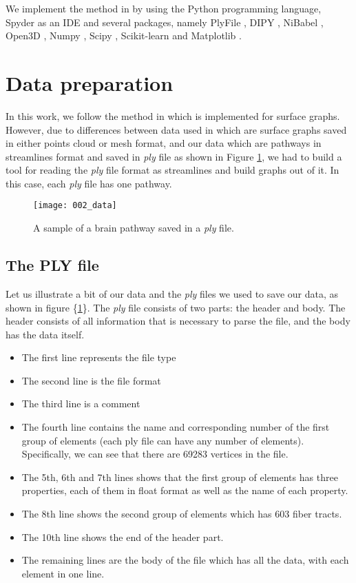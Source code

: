 \documentclass[../structure.tex]{subfiles}
\begin{document}
We implement the method in \cite{Amberg2007} by using the Python programming language, Spyder as an IDE \cite{spyder} and several packages, namely PlyFile \cite{plyfile}, DIPY \cite{nipy}, NiBabel \cite{nipy}, Open3D \cite{Zhou2018}, Numpy \cite{numpy}, Scipy \cite{scipy}, Scikit-learn \cite{sklearn} and Matplotlib \cite{matplotlib}.

\section{Data preparation}
\hspace{2em}In this work, we follow the method in \cite{Amberg2007} which is implemented for surface graphs. However, due to differences between data used in \cite{Amberg2007} which are surface graphs saved in either points cloud or mesh format, and our data which are pathways in streamlines format and saved in \textit{ply} file as shown in Figure \ref{fig:data}, we had to build a tool for reading the \textit{ply} file format as streamlines and build graphs out of it. In this case, each \textit{ply} file has one pathway.

\begin{figure}[h!]
\centering
\texttt{[image: 002\_data]}
\captionsetup{justification=centering}
\caption{A sample of a brain pathway saved in a \textit{ply} file.}
\label{fig:data}
\end{figure}

\subsection{The PLY file}
\hspace{2em}Let us illustrate a bit of our data and the \textit{ply} files we used to save our data, as shown in figure \{\ref{fig:data}\}. The \textit{ply} file consists of two parts: the header and body. The header consists of all information that is necessary to parse the file, and the body has the data itself.
\begin{itemize}
\item The first line represents the file type
\item The second line is the file format
\item The third line is a comment
\item The fourth line contains the name and corresponding number of the first group of elements (each ply file can have any number of elements). Specifically, we can see that there are 69283 vertices in the file.
\item The 5th, 6th and 7th lines shows that the first group of elements has three properties, each of them in float format as well as  the name of each property.
\item The 8th line shows the second group of elements which has 603 fiber tracts.
\item The 10th line shows the end of the header part.
\item The remaining lines are the body of the file which has all the data, with each element in one line.
\end{itemize}
\end{document}
